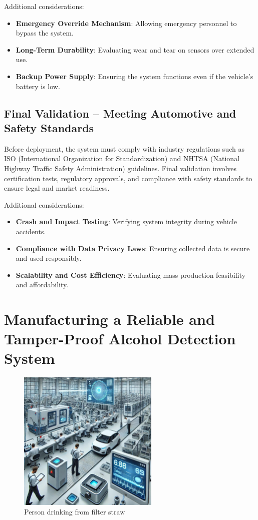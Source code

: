 \documentclass{article}
\begin{document}
Additional considerations:
\begin{itemize}
    \item \textbf{Emergency Override Mechanism}: Allowing emergency personnel to bypass the system.
    \item \textbf{Long-Term Durability}: Evaluating wear and tear on sensors over extended use.
    \item \textbf{Backup Power Supply}: Ensuring the system functions even if the vehicle's battery is low.
\end{itemize}

\subsection{Final Validation – Meeting Automotive and Safety Standards}
Before deployment, the system must comply with industry regulations such as ISO (International Organization for Standardization) and NHTSA (National Highway Traffic Safety Administration) guidelines. Final validation involves certification tests, regulatory approvals, and compliance with safety standards to ensure legal and market readiness.

Additional considerations:
\begin{itemize}
    \item \textbf{Crash and Impact Testing}: Verifying system integrity during vehicle accidents.
    \item \textbf{Compliance with Data Privacy Laws}: Ensuring collected data is secure and used responsibly.
    \item \textbf{Scalability and Cost Efficiency}: Evaluating mass production feasibility and affordability.
\end{itemize}

\newpage

\section{Manufacturing a Reliable and Tamper-Proof Alcohol Detection System}

\begin{figure}[h!]
    \centering
    \includegraphics[width=0.6\textwidth]{ac/6.jpg}
    \caption{Person drinking from filter straw}
    \label{fig:Drinking_water}
\end{figure}
\end{document}
